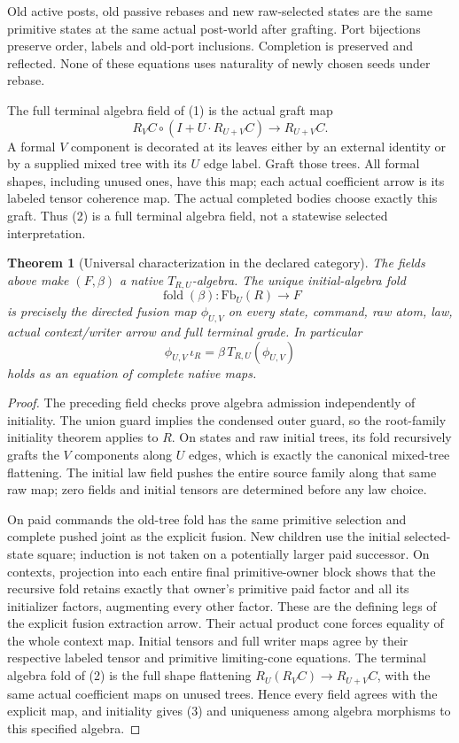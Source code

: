 \documentclass[11pt]{article}\usepackage{amsmath,amssymb,amsthm,geometry}\geometry{margin=1in}\newtheorem{lemma}{Lemma}\newtheorem{theorem}[lemma]{Theorem}
\begin{document}
Old active posts, old passive rebases and new raw-selected states are the same primitive states at the same actual post-world after grafting. Port bijections preserve order, labels and old-port inclusions. Completion is preserved and reflected. None of these equations uses naturality of newly chosen seeds under rebase.

The full terminal algebra field of (1) is the actual graft map
\[
 R_VC\circ(I+U\cdot R_{U+V}C)\longrightarrow R_{U+V}C. \tag{2}
\]
A formal $V$ component is decorated at its leaves either by an external identity or by a supplied mixed tree with its $U$ edge label. Graft those trees. All formal shapes, including unused ones, have this map; each actual coefficient arrow is its labeled tensor coherence map. The actual completed bodies choose exactly this graft. Thus (2) is a full terminal algebra field, not a statewise selected interpretation.

\begin{theorem}[Universal characterization in the declared category]
The fields above make $(F,\beta)$ a native $T_{R,U}$-algebra. The unique initial-algebra fold
\[
 \operatorname{fold}(\beta):\mathrm{Fb}_U(R)\longrightarrow F
\]
is precisely the directed fusion map $\phi_{U,V}$ on every state, command, raw atom, law, actual context/writer arrow and full terminal grade. In particular
\[
 \phi_{U,V}\,\iota_R=\beta\,T_{R,U}(\phi_{U,V})       \tag{3}
\]
holds as an equation of complete native maps.
\end{theorem}
\begin{proof}
The preceding field checks prove algebra admission independently of initiality. The union guard implies the condensed outer guard, so the root-family initiality theorem applies to $R$. On states and raw initial trees, its fold recursively grafts the $V$ components along $U$ edges, which is exactly the canonical mixed-tree flattening. The initial law field pushes the entire source family along that same raw map; zero fields and initial tensors are determined before any law choice.

On paid commands the old-tree fold has the same primitive selection and complete pushed joint as the explicit fusion. New children use the initial selected-state square; induction is not taken on a potentially larger paid successor. On contexts, projection into each entire final primitive-owner block shows that the recursive fold retains exactly that owner's primitive paid factor and all its initializer factors, augmenting every other factor. These are the defining legs of the explicit fusion extraction arrow. Their actual product cone forces equality of the whole context map. Initial tensors and full writer maps agree by their respective labeled tensor and primitive limiting-cone equations. The terminal algebra fold of (2) is the full shape flattening $R_U(R_VC)\to R_{U+V}C$, with the same actual coefficient maps on unused trees. Hence every field agrees with the explicit map, and initiality gives (3) and uniqueness among algebra morphisms to this specified algebra.
\end{proof}
\end{document}
